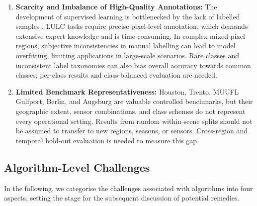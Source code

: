 \documentclass[]{interact}
\theoremstyle{plain}%
\theoremstyle{definition}
\theoremstyle{remark}
\DeclareRobustCommand{\DIFadd}[1]{{\protect\color{DIFaddcolor}\uwave{#1}}}
\DeclareRobustCommand{\DIFdel}[1]{{\protect\color{DIFdelcolor}\sout{#1}}}
\def\DIFadd#1{#1}%
\def\DIFdel#1{}%
\begin{document}
\begin{enumerate}
	\item \textbf{Scarcity \DIFadd{and} \DIFadd{Imbalance} of High-Quality Annotations:} The development of supervised learning is bottlenecked by the lack of \DIFdel{labeled} \DIFadd{labelled} samples \citep{56}. LULC tasks require precise pixel-level annotation, which demands extensive expert knowledge and is time-consuming. In complex mixed-pixel regions, subjective inconsistencies in manual \DIFdel{labeling} \DIFadd{labelling} can lead to model overfitting, limiting applications in large-scale scenarios. \DIFadd{Rare} \DIFadd{classes} \DIFadd{and} \DIFadd{inconsistent} \DIFadd{label} \DIFadd{taxonomies} \DIFadd{can} \DIFadd{also} \DIFadd{bias} \DIFadd{overall} \DIFadd{accuracy} \DIFadd{towards} \DIFadd{common} \DIFadd{classes}\DIFadd{;} \DIFadd{per-class} \DIFadd{results} \DIFadd{and} \DIFadd{class-balanced} \DIFadd{evaluation} \DIFadd{are} \DIFadd{needed}\DIFadd{.}
	\item \textbf{\DIFadd{Limited} \DIFadd{Benchmark} \DIFadd{Representativeness}\DIFadd{:}} \DIFadd{Houston}\DIFadd{,} \DIFadd{Trento}\DIFadd{,} \DIFadd{MUUFL} \DIFadd{Gulfport}\DIFadd{,} \DIFadd{Berlin}\DIFadd{,} \DIFadd{and} \DIFadd{Augsburg} \DIFadd{are} \DIFadd{valuable} \DIFadd{controlled} \DIFadd{benchmarks}\DIFadd{,} \DIFadd{but} \DIFadd{their} \DIFadd{geographic} \DIFadd{extent}\DIFadd{,} \DIFadd{sensor} \DIFadd{combinations}\DIFadd{,} \DIFadd{and} \DIFadd{class} \DIFadd{schemes} \DIFadd{do} \DIFadd{not} \DIFadd{represent} \DIFadd{every} \DIFadd{operational} \DIFadd{setting}\DIFadd{.} \DIFadd{Results} \DIFadd{from} \DIFadd{random} \DIFadd{within-scene} \DIFadd{splits} \DIFadd{should} \DIFadd{not} \DIFadd{be} \DIFadd{assumed} \DIFadd{to} \DIFadd{transfer} \DIFadd{to} \DIFadd{new} \DIFadd{regions}\DIFadd{,} \DIFadd{seasons}\DIFadd{,} \DIFadd{or} \DIFadd{sensors}\DIFadd{.} \DIFadd{Cross-region} \DIFadd{and} \DIFadd{temporal} \DIFadd{hold-out} \DIFadd{evaluation} \DIFadd{is} \DIFadd{needed} \DIFadd{to} \DIFadd{measure} \DIFadd{this} \DIFadd{gap}\DIFadd{.}
\end{enumerate}


\subsection{Algorithm-Level Challenges}

In the following, we \DIFdel{categorize} \DIFadd{categorise} the challenges associated with algorithms into \DIFdel{three} \DIFadd{four} aspects, setting the stage for the subsequent discussion of potential remedies.
\end{document}
